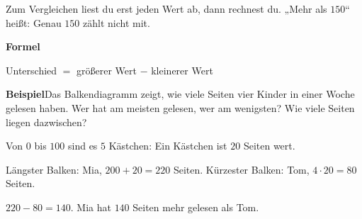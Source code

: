 \documentclass[11pt]{article}
\makeatletter
\newlength{\kr}
\newcommand{\karomerk}[2]{\protected@write\@auxout{}{\string\karoseite{#1}{#2}{\thepage}}}
\newcommand{\karoseite}[3]{\expandafter\xdef\csname karo@#1@#2\endcsname{#3}}
\makeatother
\begin{document}
\ifdim\kr>12mm\karomerk{k}{A}\noindent{\scriptsize\color{mbgrau}Platz zum Rechnen}\par\nointerlineskip\vspace{1mm}\noindent
\begin{tikzpicture}\clip (0,0) rectangle ({\linewidth-0.5mm},\kr);\draw[black!16,line width=0.3pt,step=5mm] (0,0) grid (\linewidth,\kr);\end{tikzpicture}\fi\par
\clearpage\label{s:B}\noindent\colorbox{black!12}{}\hspace{3mm}{\Large\bfseries Werte vergleichen und auswählen}\par\smallskip
\noindent Zum Vergleichen liest du erst jeden Wert ab, dann rechnest du. „Mehr als $150$“ heißt: Genau $150$ zählt nicht mit.\par\medskip
\noindent\textbf{Formel}\par\nopagebreak\noindent\hspace*{4mm}\begin{minipage}{\dimexpr\linewidth-4mm\relax}Unterschied $=$ größerer Wert $-$ kleinerer Wert\end{minipage}\par\medskip
\noindent\textbf{Beispiel}\quad Das Balkendiagramm zeigt, wie viele Seiten vier Kinder in einer Woche gelesen haben. Wer hat am meisten gelesen, wer am wenigsten? Wie viele Seiten liegen dazwischen?\par\smallskip
\noindent\begin{minipage}[t]{0.6\linewidth}\vspace{0pt}\par\noindent{}Von $0$ bis $100$ sind es $5$ Kästchen: Ein Kästchen ist $20$ Seiten wert.\par\smallskip\par\noindent{}Längster Balken: Mia, $200 + 20 = 220$ Seiten. Kürzester Balken: Tom, $4 \cdot 20 = 80$ Seiten.\par\smallskip\par\noindent{}$220 - 80 = 140$. Mia hat $140$ Seiten mehr gelesen als Tom.\par\smallskip\end{minipage}\hfill
\end{document}
